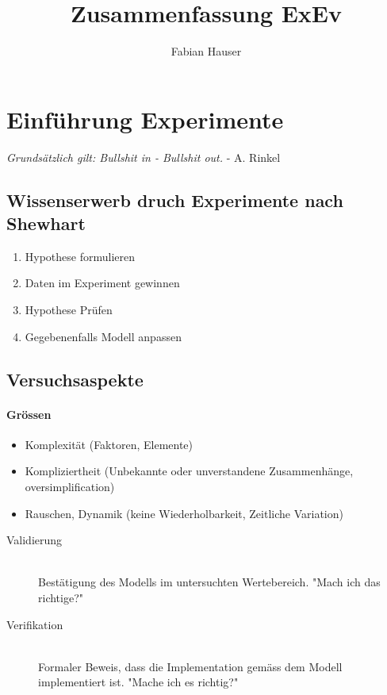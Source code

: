 

\usepackage{tikz}
\usetikzlibrary{shapes,backgrounds}


\title{Zusammenfassung ExEv}
\author{Fabian Hauser}
 

\maketitle

\section{Einführung Experimente}

\emph{Grundsätzlich gilt: Bullshit in - Bullshit out.} - A. Rinkel

\subsection{Wissenserwerb druch Experimente nach Shewhart}
\begin{enumerate}
	\item	Hypothese formulieren
	\item	Daten im Experiment gewinnen
	\item	Hypothese Prüfen
	\item	Gegebenenfalls Modell anpassen
\end{enumerate}

\subsection{Versuchsaspekte}
\paragraph{Grössen}
\begin{itemize}
	\item	Komplexität			(Faktoren, Elemente)
	\item	Kompliziertheit		(Unbekannte oder unverstandene Zusammenhänge, oversimplification)
	\item	Rauschen, Dynamik	(keine Wiederholbarkeit, Zeitliche Variation)
\end{itemize}

\begin{description}
	\item[Validierung] \hfill \\
		Bestätigung des Modells im untersuchten Wertebereich. "Mach ich das richtige?"
	\item[Verifikation] \hfill \\
		Formaler Beweis, dass die Implementation gemäss dem Modell implementiert ist. "Mache ich es richtig?"
\end{description}

